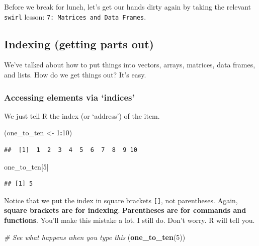 \documentclass[]{article}
\newenvironment{Shaded}{\begin{snugshade}}{\end{snugshade}}
\newcommand{\KeywordTok}[1]{\textcolor[rgb]{0.13,0.29,0.53}{\textbf{#1}}}
\newcommand{\DecValTok}[1]{\textcolor[rgb]{0.00,0.00,0.81}{#1}}
\newcommand{\StringTok}[1]{\textcolor[rgb]{0.31,0.60,0.02}{#1}}
\newcommand{\CommentTok}[1]{\textcolor[rgb]{0.56,0.35,0.01}{\textit{#1}}}
\newcommand{\OperatorTok}[1]{\textcolor[rgb]{0.81,0.36,0.00}{\textbf{#1}}}
\newcommand{\NormalTok}[1]{#1}
\begin{document}
Before we break for lunch, let's get our hands dirty again by taking the
relevant \texttt{swirl} lesson:
\texttt{7:\ Matrices\ and\ Data\ Frames}.

\subsection{Indexing (getting parts
out)}\label{indexing-getting-parts-out}

We've talked about how to put things into vectors, arrays, matrices,
data frames, and lists. How do we get things out? It's easy.

\subsubsection{\texorpdfstring{Accessing elements via
`indices'}{Accessing elements via indices}}\label{accessing-elements-via-indices}

We just tell R the index (or `address') of the item.

\begin{Shaded}
\begin{Highlighting}[]
\NormalTok{(one_to_ten <-}\StringTok{ }\DecValTok{1}\OperatorTok{:}\DecValTok{10}\NormalTok{)}
\end{Highlighting}
\end{Shaded}

\begin{verbatim}
##  [1]  1  2  3  4  5  6  7  8  9 10
\end{verbatim}

\begin{Shaded}
\begin{Highlighting}[]
\NormalTok{one_to_ten[}\DecValTok{5}\NormalTok{]}
\end{Highlighting}
\end{Shaded}

\begin{verbatim}
## [1] 5
\end{verbatim}

Notice that we put the index in square brackets \texttt{{[}{]}}, not
parentheses. Again, \textbf{square brackets are for indexing}.
\textbf{Parentheses are for commands and functions}. You'll make this
mistake a lot. I still do. Don't worry. R will tell you.

\begin{Shaded}
\begin{Highlighting}[]
\CommentTok{# See what happens when you type this}
\NormalTok{(}\KeywordTok{one_to_ten}\NormalTok{(}\DecValTok{5}\NormalTok{))}
\end{Highlighting}
\end{Shaded}
\end{document}

